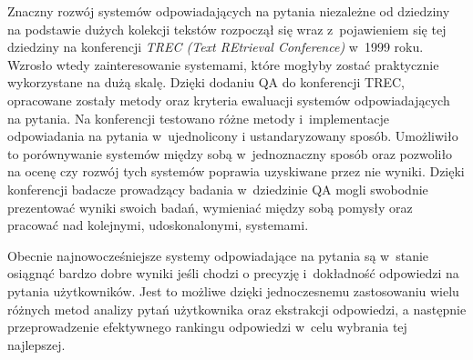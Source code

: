 \documentclass[a4paper, twoside, 12pt]{report}
\begin{document}
            Znaczny rozwój systemów odpowiadających na pytania niezależne od dziedziny na podstawie dużych kolekcji
            tekstów rozpoczął się wraz z~pojawieniem się tej dziedziny na konferencji \emph{TREC (Text REtrieval Conference)}
            w~1999 roku.
            Wzrosło wtedy zainteresowanie systemami, które mogłyby zostać praktycznie wykorzystane na dużą skalę. Dzięki
            dodaniu QA do konferencji TREC, opracowane zostały metody oraz kryteria ewaluacji systemów odpowiadających
            na pytania. Na konferencji testowano różne metody i~implementacje odpowiadania na pytania w~ujednolicony i
            ustandaryzowany sposób. Umożliwiło to porównywanie systemów między sobą w~jednoznaczny sposób oraz pozwoliło na ocenę
            czy rozwój tych systemów poprawia uzyskiwane przez nie wyniki. Dzięki konferencji badacze prowadzący badania
            w~dziedzinie QA mogli swobodnie prezentować wyniki swoich badań, wymieniać między sobą pomysły oraz pracować
            nad kolejnymi, udoskonalonymi, systemami.

            Obecnie najnowocześniejsze systemy odpowiadające na pytania są w~stanie osiągnąć bardzo dobre wyniki jeśli
            chodzi o precyzję i~dokładność odpowiedzi na pytania użytkowników. Jest to możliwe dzięki jednoczesnemu zastosowaniu
            wielu różnych metod analizy pytań użytkownika oraz ekstrakcji odpowiedzi, a następnie przeprowadzenie efektywnego
            rankingu odpowiedzi w~celu wybrania tej najlepszej.
\end{document}
